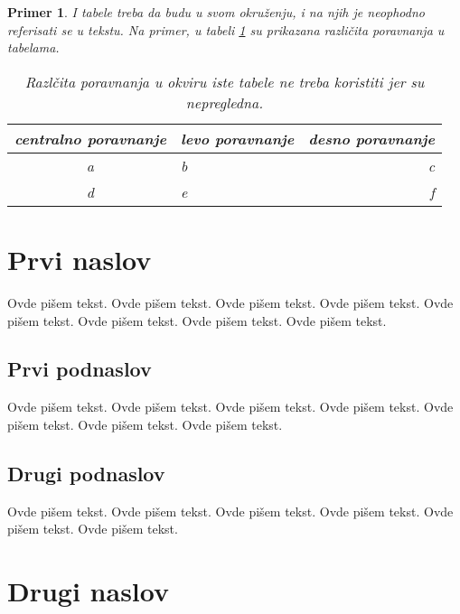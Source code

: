 \documentclass[a4paper]{article}
\newtheorem{primer}{Primer}[section]
\begin{document}
\begin{primer} I tabele treba da budu u svom okruženju, i na njih je neophodno referisati se u tekstu. Na primer, u tabeli \ref{tab:tabela1} su prikazana različita poravnanja u tabelama.

\begin{table}[h!]
\begin{center}
\caption{Razlčita poravnanja u okviru iste tabele ne treba koristiti jer su nepregledna.}
\begin{tabular}{|c|l|r|} \hline
centralno poravnanje& levo poravnanje& desno poravnanje\\ \hline
a &b&c\\ \hline
d &e&f\\ \hline
\end{tabular}
\label{tab:tabela1}
\end{center}
\end{table}

\end{primer}





\section{Prvi naslov}
\label{sec:naslov1}


Ovde pišem tekst. 
Ovde pišem tekst. 
Ovde pišem tekst. 
Ovde pišem tekst. 
Ovde pišem tekst. 
Ovde pišem tekst. 
Ovde pišem tekst. 
Ovde pišem tekst. 


\subsection{Prvi podnaslov}
\label{subsec:podnaslov1}

Ovde pišem tekst. 
Ovde pišem tekst. 
Ovde pišem tekst. 
Ovde pišem tekst. 
Ovde pišem tekst. 
Ovde pišem tekst. 
Ovde pišem tekst. 

\subsection{Drugi podnaslov}
\label{subsec:podnaslov2}

Ovde pišem tekst. 
Ovde pišem tekst. 
Ovde pišem tekst. 
Ovde pišem tekst. 
Ovde pišem tekst. 
Ovde pišem tekst. 

\section{Drugi naslov}
\label{sec:naslov2}
\end{document}
